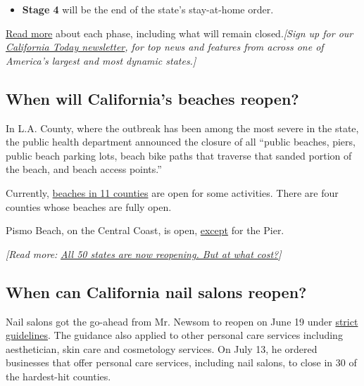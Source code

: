 \begin{itemize}
\tightlist
\item
  \textbf{Stage 4} will be the end of the state's stay-at-home order.
\end{itemize}

\href{https://www.nytimes.com/2020/04/29/us/california-reopen-coronavirus.html}{Read
more} about each phase, including what will remain closed.\emph{{[}Sign
up for our}
\href{https://www.nytimes.com/newsletters/california-today}{\emph{California
Today newsletter}}\emph{, for top news and features from across one of
America's largest and most dynamic states.{]}}

\hypertarget{when-will-californias-beaches-reopen}{%
\subsection{When will California's beaches
reopen?}\label{when-will-californias-beaches-reopen}}

In L.A. County, where the outbreak has been among the most severe in the
state, the public health department announced the closure of all
``public beaches, piers, public beach parking lots, beach bike paths
that traverse that sanded portion of the beach, and beach access
points.''

Currently,
\href{https://www.latimes.com/projects/california-coronavirus-cases-tracking-outbreak/beach-closures/}{beaches
in 11 counties} are open for some activities. There are four counties
whose beaches are fully open.

Pismo Beach, on the Central Coast, is open,
\href{http://pismobeach.org/938/CovidResponse}{except} for the Pier.

\emph{{[}Read more:}
\href{https://www.nytimes.com/2020/05/20/us/coronavirus-reopening-50-states.html}{\emph{All
50 states are now reopening. But at what cost?}}\emph{{]}}

\hypertarget{when-can-california-nail-salons-reopen}{%
\subsection{When can California nail salons
reopen?}\label{when-can-california-nail-salons-reopen}}

Nail salons got the go-ahead from Mr. Newsom to reopen on June 19 under
\href{https://covid19.ca.gov/pdf/expanded-personal-services.pdf}{strict
guidelines}. The guidance also applied to other personal care services
including aesthetician, skin care and cosmetology services. On July 13,
he ordered businesses that offer personal care services, including nail
salons, to close in 30 of the hardest-hit counties.

